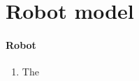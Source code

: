\section{Robot model}
\label{sec:program}

\paragraph{Robot}

\begin{enumerate}
	\item The \\
\end{enumerate}
